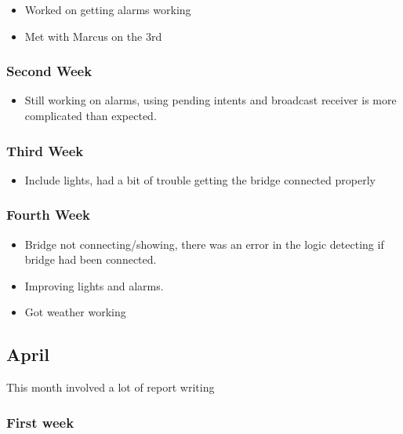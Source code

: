 \begin{itemize}
\tightlist
\item
  Worked on getting alarms working
\item
  Met with Marcus on the 3rd
\end{itemize}

\subsubsection*{Second Week}\label{second-week-5}

\begin{itemize}
\tightlist
\item
  Still working on alarms, using pending intents and broadcast receiver
  is more complicated than expected.
\end{itemize}

\subsubsection*{Third Week}\label{third-week-4}

\begin{itemize}
\tightlist
\item
  Include lights, had a bit of trouble getting the bridge connected
  properly
\end{itemize}

\subsubsection*{Fourth Week}\label{fourth-week-4}

\begin{itemize}
\tightlist
\item
  Bridge not connecting/showing, there was an error in the logic
  detecting if bridge had been connected.
\item
  Improving lights and alarms.
\item
  Got weather working
\end{itemize}

\subsection{April}\label{april}

This month involved a lot of report writing

\subsubsection*{First week}\label{first-week-6}

